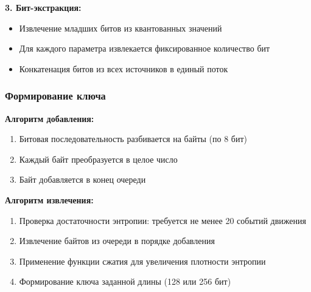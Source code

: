 \documentclass[14pt, a4paper]{extreport}
\begin{document}
\textbf{3. Бит-экстракция:}
\begin{itemize}
    \item Извлечение младших битов из квантованных значений
    \item Для каждого параметра извлекается фиксированное количество бит
    \item Конкатенация битов из всех источников в единый поток
\end{itemize}

\begin{table}[H]
\centering
\caption{Параметры извлечения энтропии из различных источников}
\label{tab:entropy_sources}
\end{table}

\subsubsection{Формирование ключа}
\textbf{Алгоритм добавления:}
\begin{enumerate}
    \item Битовая последовательность разбивается на байты (по 8 бит)
    \item Каждый байт преобразуется в целое число
    \item Байт добавляется в конец очереди
\end{enumerate}

\textbf{Алгоритм извлечения:}
\begin{enumerate}
    \item Проверка достаточности энтропии: требуется не менее 20 событий движения
    \item Извлечение байтов из очереди в порядке добавления
    \item Применение функции сжатия для увеличения плотности энтропии
    \item Формирование ключа заданной длины (128 или 256 бит)
\end{enumerate}
\end{document}
